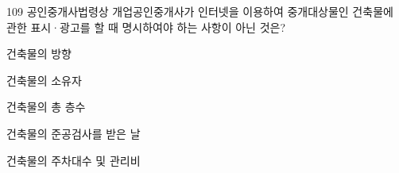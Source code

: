 \begin{question}{109}
공인중개사법령상 개업공인중개사가 인터넷을 이용하여 중개대상물인 건축물에 관한 표시·광고를 할 때 명시하여야 하는 사항이 아닌 것은?
\begin{choices}
  \item 건축물의 방향
  \item 건축물의 소유자
  \item 건축물의 총 층수
  \item 건축물의 준공검사를 받은 날
  \item 건축물의 주차대수 및 관리비
\end{choices}
\end{question}

